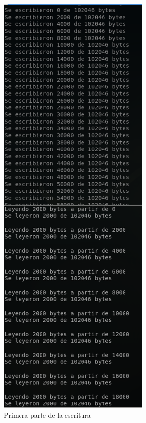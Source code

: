 \documentclass[12pt,journal,compsoc]{IEEEtran}
\begin{document}
\begin{figure}[H]
  \centering
  \includegraphics[width=75mm]{images/punto-3/write/2-start-write.png}
  \caption{Primera parte de la escritura}
  \label{fig:start-write}
\end{figure}
\end{document}
